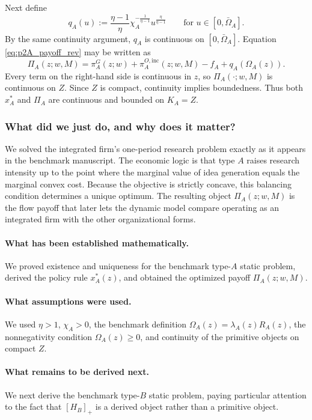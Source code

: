 Next define
\[
q_A(u):=\frac{\eta-1}{\eta}\chi_A^{-\frac{1}{\eta-1}}u^{\frac{\eta}{\eta-1}}
\qquad\text{for }u\in[0,\bar\Omega_A].
\]
By the same continuity argument, $q_A$ is continuous on $[0,\bar\Omega_A]$. Equation \eqref{eq:p2A_payoff_rev} may be written as
\[
\Pi_A(z;w,M)=\pi_A^G(z;w)+\pi_A^{O,\mathrm{inc}}(z;w,M)-f_A+q_A(\Omega_A(z)).
\]
Every term on the right-hand side is continuous in $z$, so $\Pi_A(\cdot;w,M)$ is continuous on $Z$. Since $Z$ is compact, continuity implies boundedness. Thus both $x_A^*$ and $\Pi_A$ are continuous and bounded on $K_A=Z$.

\subsubsection*{What did we just do, and why does it matter?}
We solved the integrated firm's one-period research problem exactly as it appears in the benchmark manuscript. The economic logic is that type $A$ raises research intensity up to the point where the marginal value of idea generation equals the marginal convex cost. Because the objective is strictly concave, this balancing condition determines a unique optimum. The resulting object $\Pi_A(z;w,M)$ is the flow payoff that later lets the dynamic model compare operating as an integrated firm with the other organizational forms.

\paragraph{What has been established mathematically.}
We proved existence and uniqueness for the benchmark type-$A$ static problem, derived the policy rule $x_A^*(z)$, and obtained the optimized payoff $\Pi_A(z;w,M)$.

\paragraph{What assumptions were used.}
We used $\eta>1$, $\chi_A>0$, the benchmark definition $\Omega_A(z)=\lambda_A(z)R_A(z)$, the nonnegativity condition $\Omega_A(z)\ge 0$, and continuity of the primitive objects on compact $Z$.

\paragraph{What remains to be derived next.}
We next derive the benchmark type-$B$ static problem, paying particular attention to the fact that $[H_B]_+$ is a derived object rather than a primitive object.


